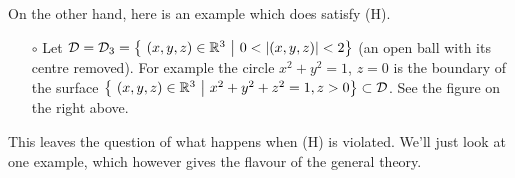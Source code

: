 \begin{eg}
\begin{itemize}
\end{itemize}
On the other hand, here is an example which does satisfy (H).

\begin{itemize}\itemsep1pt \parskip0pt  %
\item[$\circ$]
Let $\cD=\cD_3=\big\{\ (x,y,z)\in\bbbr^3\ \big|\ 0<|(x,y,z)|<2\big\}$
(an open ball with its centre removed).
For example the circle $x^2+y^2=1$, $z=0$  is the boundary of the surface
$\big\{\ (x,y,z)\in\bbbr^3\ \big|\ x^2+y^2+z^2=1, z>0\big\}\subset\cD$.
See the figure on the right above.
\end{itemize}
\end{eg}

\noindent This leaves the question of what happens when (H) is violated.
We'll just look at one example, which however gives the flavour of the
general theory.



